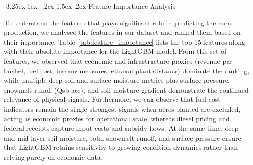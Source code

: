 \documentclass[10pt,twocolumn]{article}
\makeatletter
\newcommand{\reftab}[1]{Table~\ref{#1}}
\renewcommand\subsection{\@startsection{subsection}{2}{\z@}%
  {-3.25ex\@plus -1ex \@minus -.2ex}%
  {1.5ex \@plus .2ex}%
  {\normalfont\normalsize\bfseries}}
\makeatother
\begin{document}
\subsection{Feature Importance Analysis}

To understand the features that plays significant role in predicting the corn production, we analysed the features in our dataset and ranked them based on their importance.
\reftab{tab:feature_importance} lists the top 15 features along with their absolute importance for the LightGBM model.
From this set of features, we observed that economic and infrastructure proxies (revenue per bushel, fuel cost, income measures, ethanol plant distance) dominate the ranking, while multiple deep-soil and surface moisture metrics plus surface pressure, snowmelt runoff (Qsb acc), and soil-moisture gradient demonstrate the continued relevance of physical signals.
Furthermore, we can observe that fuel cost indicators remain the single strongest signals when acres planted are excluded, acting as economic proxies for operational scale, whereas diesel pricing and federal receipts capture input costs and subsidy flows.
At the same time, deep- and mid-layer soil moisture, total snowmelt runoff, and surface pressure ensure that LightGBM retains sensitivity to growing-condition dynamics rather than relying purely on economic data.

\begin{table}[htb]
    \centering
    \caption{Feature Importance Analysis for the LightGBM model}
    \label{tab:feature_importance}
\end{table}
\end{document}
